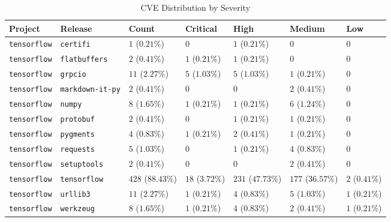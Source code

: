\begin{table}
\caption{CVE Distribution by Severity}
\label{tab:cve-distribution}
\begin{tabular}{lllllll}
\toprule
Project & Release & Count & Critical & High & Medium & Low \\
\midrule
\texttt{tensorflow} & \texttt{certifi} & $1$ ($0.21\%$) & $0$ & $1$ ($0.21\%$) & $0$ & $0$ \\
\texttt{tensorflow} & \texttt{flatbuffers} & $2$ ($0.41\%$) & $1$ ($0.21\%$) & $1$ ($0.21\%$) & $0$ & $0$ \\
\texttt{tensorflow} & \texttt{grpcio} & $11$ ($2.27\%$) & $5$ ($1.03\%$) & $5$ ($1.03\%$) & $1$ ($0.21\%$) & $0$ \\
\texttt{tensorflow} & \texttt{markdown-it-py} & $2$ ($0.41\%$) & $0$ & $0$ & $2$ ($0.41\%$) & $0$ \\
\texttt{tensorflow} & \texttt{numpy} & $8$ ($1.65\%$) & $1$ ($0.21\%$) & $1$ ($0.21\%$) & $6$ ($1.24\%$) & $0$ \\
\texttt{tensorflow} & \texttt{protobuf} & $2$ ($0.41\%$) & $0$ & $1$ ($0.21\%$) & $1$ ($0.21\%$) & $0$ \\
\texttt{tensorflow} & \texttt{pygments} & $4$ ($0.83\%$) & $1$ ($0.21\%$) & $2$ ($0.41\%$) & $1$ ($0.21\%$) & $0$ \\
\texttt{tensorflow} & \texttt{requests} & $5$ ($1.03\%$) & $0$ & $1$ ($0.21\%$) & $4$ ($0.83\%$) & $0$ \\
\texttt{tensorflow} & \texttt{setuptools} & $2$ ($0.41\%$) & $0$ & $0$ & $2$ ($0.41\%$) & $0$ \\
\texttt{tensorflow} & \texttt{tensorflow} & $428$ ($88.43\%$) & $18$ ($3.72\%$) & $231$ ($47.73\%$) & $177$ ($36.57\%$) & $2$ ($0.41\%$) \\
\texttt{tensorflow} & \texttt{urllib3} & $11$ ($2.27\%$) & $1$ ($0.21\%$) & $4$ ($0.83\%$) & $5$ ($1.03\%$) & $1$ ($0.21\%$) \\
\texttt{tensorflow} & \texttt{werkzeug} & $8$ ($1.65\%$) & $1$ ($0.21\%$) & $4$ ($0.83\%$) & $2$ ($0.41\%$) & $1$ ($0.21\%$) \\
\bottomrule
\end{tabular}
\end{table}
